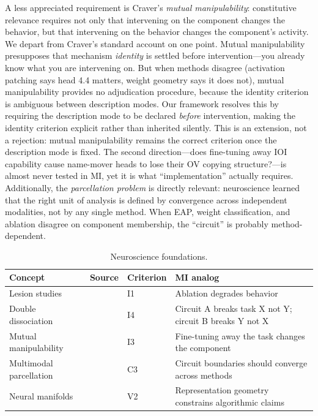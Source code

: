 \documentclass{article}
\begin{document}
A less appreciated requirement is Craver's \emph{mutual manipulability}: constitutive relevance requires not only that intervening on the component changes the behavior, but that intervening on the behavior changes the component's activity. We depart from Craver's standard account on one point. Mutual manipulability presupposes that mechanism \emph{identity} is settled before intervention---you already know what you are intervening on. But when methods disagree (activation patching says head 4.4 matters, weight geometry says it does not), mutual manipulability provides no adjudication procedure, because the identity criterion is ambiguous between description modes. Our framework resolves this by requiring the description mode to be declared \emph{before} intervention, making the identity criterion explicit rather than inherited silently. This is an extension, not a rejection: mutual manipulability remains the correct criterion once the description mode is fixed. The second direction---does fine-tuning away IOI capability cause name-mover heads to lose their OV copying structure?---is almost never tested in MI, yet it is what ``implementation'' actually requires. Additionally, the \emph{parcellation problem} is directly relevant: neuroscience learned that the right unit of analysis is defined by convergence across independent modalities, not by any single method. When EAP, weight classification, and ablation disagree on component membership, the ``circuit'' is probably method-dependent.

\begin{table}[H]
\centering\small
\caption{Neuroscience foundations.}
\renewcommand{\arraystretch}{1.12}
\begin{tabular}{@{}l>{\raggedright\arraybackslash}p{2cm}l>{\raggedright\arraybackslash}p{4.5cm}@{}}
\toprule
\textbf{Concept} & \textbf{Source} & \textbf{Criterion} & \textbf{MI analog} \\
\midrule
Lesion studies & \citet{shallice1988neuropsychology} & I1 & Ablation degrades behavior \\
\midrule
Double dissociation & \citet{shallice1988neuropsychology} & I4 & Circuit A breaks task X not Y; circuit B breaks Y not X \\
\midrule
Mutual manipulability & \citet{craver2007explaining} & I3 & Fine-tuning away the task changes the component \\
\midrule
Multimodal parcellation & \citet{glasser2016multi} & C3 & Circuit boundaries should converge across methods \\
\midrule
Neural manifolds & \citet{gallego2017neural} & V2 & Representation geometry constrains algorithmic claims \\
\bottomrule
\end{tabular}
\end{table}
\end{document}
